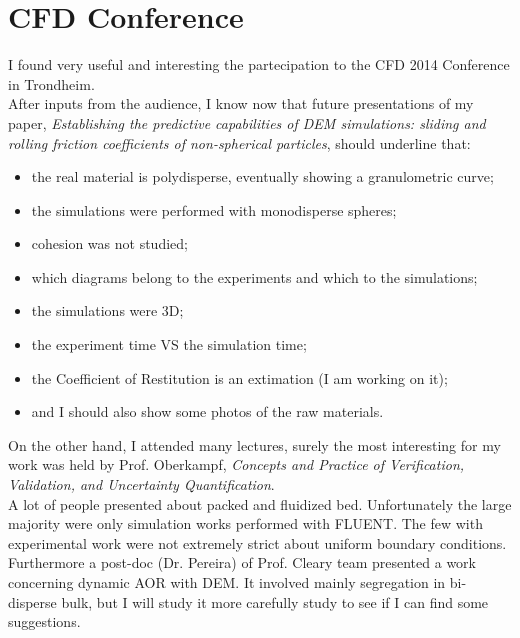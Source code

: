 
\section{CFD Conference}
\label{sec:cfdconference}

I found very useful and interesting the partecipation to the CFD 2014 Conference in Trondheim.\\
After inputs from the audience, I know now that future presentations of my paper, \textit{Establishing the predictive capabilities of DEM simulations: sliding and rolling friction coefficients of non-spherical particles}, should underline that: 
\begin{itemize}
\item{the real material is polydisperse, eventually showing a granulometric curve;}
\item{the simulations were performed with monodisperse spheres;}
\item{cohesion was not studied;}
\item{which diagrams belong to the experiments and which to the simulations;}
\item{the simulations were 3D;}
\item{the experiment time VS the simulation time;}
\item{the Coefficient of Restitution is an extimation (I am working on it);}
\item{and I should also show some photos of the raw materials.}
\end{itemize}

On the other hand, I attended many lectures, surely the most interesting for my work was held by Prof. Oberkampf, \textit{Concepts and Practice of Verification, Validation, and Uncertainty Quantification}. \\
A lot of people presented about packed and fluidized bed. Unfortunately the large majority were only simulation works performed with FLUENT. The few with experimental work were not extremely strict about uniform boundary conditions.
Furthermore a post-doc (Dr. Pereira) of Prof. Cleary team presented a work concerning dynamic AOR with DEM. It involved mainly segregation in bi-disperse bulk, but I will study it more carefully study to see if I can find some suggestions.\\